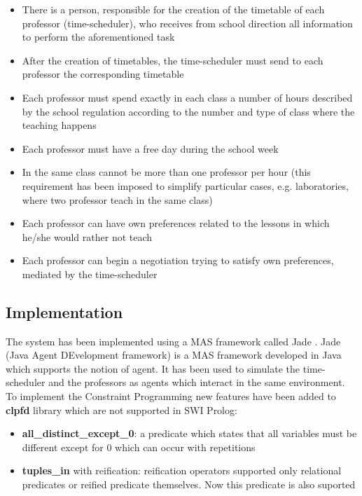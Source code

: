 \begin{itemize}
    \item There is a person, responsible for the creation of the timetable of each professor (time-scheduler), who receives from school direction all information to perform the aforementioned task
    \item After the creation of timetables, the time-scheduler must send to each professor the corresponding timetable
    \item Each professor must spend exactly in each class a number of hours described by the school regulation according to the number and type of class where the teaching happens
    \item Each professor must have a free day during the school week
    \item In the same class cannot be more than one professor per hour (this requirement has been imposed to simplify particular cases, e.g. laboratories, where two professor teach in the same class)
    \item Each professor can have own preferences related to the lessons in which he/she would rather not teach 
    \item Each professor can begin a negotiation trying to satisfy own preferences, mediated by the time-scheduler   
\end{itemize}

\subsection{Implementation}\label{subsec:implementation}
The system has been implemented using a MAS framework called Jade \cite{10.1007/3-540-44631-1_7}.
Jade (Java Agent DEvelopment framework) is a MAS framework developed in Java which supports the notion of agent. It has been used to simulate the time-scheduler and the professors as agents which interact in the same environment.\newline
To implement the Constraint Programming new features have been added to \textbf{clpfd} library which are not supported in SWI Prolog:
\begin{itemize}
    \item \textbf{all\_distinct\_except\_0}: a predicate which states that all variables must be different except for 0 which can occur with repetitions
    \item \textbf{tuples\_in} with reification: reification operators supported only relational predicates or reified predicate themselves. Now this predicate is also suported
\end{itemize}

